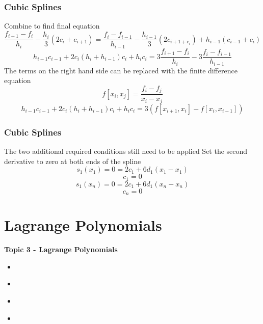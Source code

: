 \documentclass[fleqn]{beamer} %
\newcommand{\sectionIVtitle}{Lagrange Polynomials}
\newcommand{\sectionIIIsubsectionIVtitle}{Cubic Splines}
\newcommand{\sectionIVsubsectionItitle}{}
\newcommand{\sectionIVsubsectionIItitle}{}
\newcommand{\sectionIVsubsectionIIItitle}{}
\newcommand{\sectionIVsubsectionIVtitle}{}
\begin{document}
      \begin{frame}
				\frametitle{\sectionIIIsubsectionIVtitle} 
				\bigskip
        Combine to find final equation
        \[\frac{f_{i+1}-{f_i}}{h_i}-\frac{h_i}{3}\left(2c_i+c_{i+1}\right)=\frac{f_i-f_{i-1}}{h_{i-1}}-\frac{h_{i-1}}{3}\left(2c_{i+1+c_i}\right)+h_{i-1}\left(c_{i-1}+c_i\right)\]
				\[h_{i-1}c_{i-1}+2c_i\left(h_i+h_{i-1}\right)c_i+h_ic_i=3\frac{f_{i+1}-f_i}{h_i}-3\frac{f_i-f_{i-1}}{h_{i-1}}\]
        The terms on the right hand side can be replaced with the finite difference equation
        \[f\left[x_i,x_j\right]=\frac{f_i-f_j}{x_i-x_j}\]
				\[h_{i-1}c_{i-1}+2c_i\left(h_i+h_{i-1}\right)c_i+h_ic_i=3\left(f\left[x_{i+1},x_i\right]-f\left[x_i,x_{i-1}\right]\right)\]
        \btVFill
			\end{frame}
      	
      \begin{frame}
				\frametitle{\sectionIIIsubsectionIVtitle} 
				\bigskip
        The two additional required conditions still need to be applied\vspc
        Set the second derivative to zero at both ends of the spline
        \[s_1\left(x_1\right)=0=2c_1+6d_1\left(x_1-x_1\right)\]
        \[c_1=0\]
        \[s_1\left(x_n\right)=0=2c_1+6d_1\left(x_n-x_n\right)\]
        \[c_n=0\]
        \btVFill
			\end{frame}

      	

\section{\sectionIVtitle}\label{sectionIV}

		\begin{frame}
			\large \textbf{Topic 3 - \sectionIVtitle} \vspace{3mm}\\

			\begin{itemize}
				\item \hyperlink{sectionIVsubsectionI}{\sectionIVsubsectionItitle} \vspc %
				\item \hyperlink{sectionIVsubsectionII}{\sectionIVsubsectionIItitle} \vspc %
				\item \hyperlink{sectionIVsubsectionIII}{\sectionIVsubsectionIIItitle} \vspc %
				\item \hyperlink{sectionIVsubsectionIV}{\sectionIVsubsectionIVtitle} \vspc %
			\end{itemize}

		\end{frame}
\end{document}
